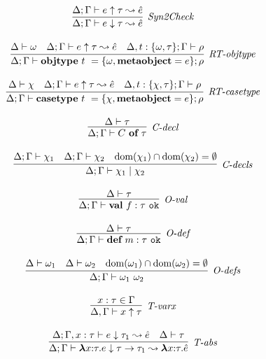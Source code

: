 \begin{figure}
\centering
\[
\begin{array}{c}

\infer[\textit{Syn2Check}]
	{\Delta; \Gamma \vdash  e \downarrow \tau \leadsto \hat{e}} 
	{\Delta;\Gamma \vdash e \uparrow \tau \leadsto \hat{e}   }\\[3ex]

\infer[\textit{RT-objtype}]
	{\Delta; \Gamma \vdash  \keyw{objtype}~ t~=\{{\omega}, \keyw{metaobject}=e\}; \rho} 
	{\Delta \vdash \omega & \Delta; \Gamma \vdash e \uparrow\tau \leadsto \hat{e} & \Delta, t:\{\omega,\tau\}; \Gamma \vdash \rho }\\[3ex]

\infer[\textit{RT-casetype}]
	{\Delta; \Gamma \vdash  \keyw{casetype}~ t~=\{\chi, \keyw{metaobject}=e\}; \rho} 
	{\Delta \vdash \chi & \Delta; \Gamma \vdash e \uparrow\tau \leadsto \hat{e} & \Delta, t:\{\chi,\tau\}; \Gamma \vdash \rho  }\\[3ex]

\infer[\textit{C-decl}]
	{\Delta; \Gamma \vdash  C~\keyw{of}~\tau} 
	{\Delta \vdash \tau   }\\[3ex]

\infer[\textit{C-decls}]
	{\Delta; \Gamma \vdash  \chi_1 \bnfalt \chi_2} 
	{\Delta; \Gamma \vdash \chi_1 & \Delta; \Gamma \vdash \chi_2 & \text{dom}(\chi_1) \intersect \text{dom}(\chi_2) = \emptyset}\\[3ex]

\infer[\textit{O-val}]
	{\Delta; \Gamma \vdash \keyw{val}~ f:\tau \ \texttt{ok} }
	{\Delta \vdash \tau} \\[3ex]
	
\infer[\textit{O-def}]
	{\Delta; \Gamma \vdash \keyw{def}~ m:\tau \ \texttt{ok} }
	{\Delta \vdash \tau } \\[3ex]

\infer[\textit{O-defs}]
	{\Delta; \Gamma \vdash \omega_1\ \omega_2  }
	{\Delta \vdash \omega_1 & \Delta \vdash \omega_2 & \text{dom}(\omega_1) \intersect \text{dom}(\omega_2) = \emptyset } \\[3ex]
	
\infer[\textit{T-varx}]
	{\Delta,\Gamma \vdash x\uparrow\tau } 
	{x:\tau \in \Gamma }\\[3ex]

\infer[\textit{T-abs}]
	{\Delta; \Gamma \vdash  \boldsymbol\lambda x{:}\tau . e \downarrow \tau \rightarrow \tau_1 \leadsto \boldsymbol\lambda x{:}\tau .\hat{e}} 
	{\Delta; \Gamma, x:\tau \vdash e\downarrow\tau_1 \leadsto \hat{e}  & \Delta\vdash \tau}\\[3ex]


\end{array}\]
\end{figure}
